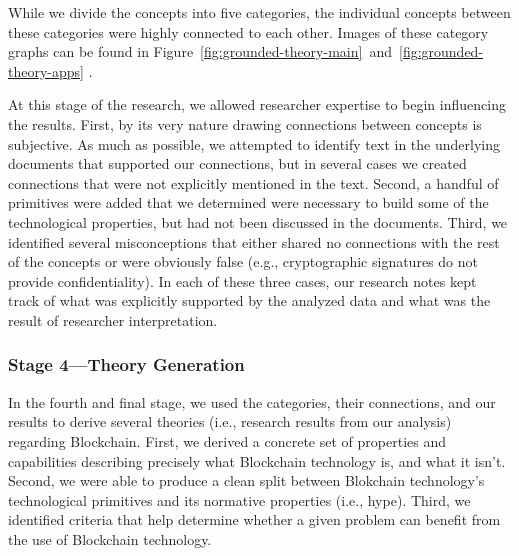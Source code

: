While we divide the concepts into five categories, the individual concepts between these categories were highly connected to each other.
Images of these category graphs can be found in Figure~\ref{fig:grounded-theory-main}~and~\ref{fig:grounded-theory-apps} .

%

At this stage of the research, we allowed researcher expertise to begin influencing the results.
First, by its very nature drawing connections between concepts is subjective.
As much as possible, we attempted to identify text in the underlying documents that supported our connections, but in several cases we created connections that were not explicitly mentioned in the text.
Second, a handful of primitives were added that we determined were necessary to build some of the technological properties, but had not been discussed in the documents.
Third, we identified several misconceptions that either shared no connections with the rest of the concepts or were obviously false (e.g., cryptographic signatures do not provide confidentiality).
In each of these three cases, our research notes kept track of what was explicitly supported by the analyzed data and what was the result of researcher interpretation.

\subsubsection{Stage 4---Theory Generation}
In the fourth and final stage, we used the categories, their connections, and our results to derive several theories (i.e., research results from our analysis) regarding Blockchain.
First, we derived a concrete set of properties and capabilities describing precisely what Blockchain technology is, and what it isn't.
Second, we were able to produce a clean split between Blokchain technology's technological primitives and its normative properties (i.e., hype).
Third, we identified criteria that help determine whether a given problem can benefit from the use of Blockchain technology.

